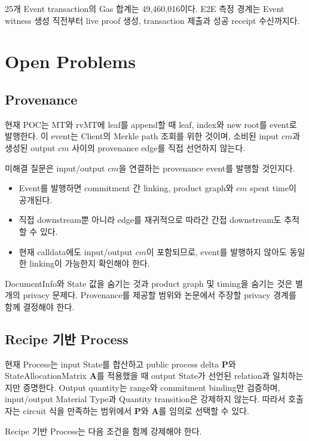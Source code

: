 \documentclass[11pt,a4paper]{extarticle}
\newcommand{\MT}{\mathrm{MT}}
\newcommand{\rvMT}{\mathrm{rvMT}}
\begin{document}
25개 Event transaction의 Gas 합계는 49,460,016이다. E2E 측정 경계는 Event witness
생성 직전부터 live proof 생성, transaction 제출과 성공 receipt 수신까지다.

\section{Open Problems}

\subsection{Provenance}

현재 POC는 $\MT$와 $\rvMT$에 leaf를 append할 때 leaf, index와 new root를 event로
발행한다. 이 event는 Client의 Merkle path 조회를 위한 것이며, 소비된 input $cm$과
생성된 output $cm$ 사이의 provenance edge를 직접 선언하지 않는다.

미해결 질문은 input/output $cm$을 연결하는 provenance event를 발행할 것인지다.

\begin{itemize}
  \item Event를 발행하면 commitment 간 linking, product graph와 $cm$ spent time이
        공개된다.
  \item 직접 downstream뿐 아니라 edge를 재귀적으로 따라간 간접 downstream도 추적할 수
        있다.
  \item 현재 calldata에도 input/output $cm$이 포함되므로, event를 발행하지 않아도 동일한
        linking이 가능한지 확인해야 한다.
\end{itemize}

DocumentInfo와 State 값을 숨기는 것과 product graph 및 timing을 숨기는 것은 별개의
privacy 문제다. Provenance를 제공할 범위와 논문에서 주장할 privacy 경계를 함께 결정해야
한다.

\subsection{Recipe 기반 Process}

현재 Process는 input State를 합산하고 public process delta $\mathbf{P}$와
StateAllocationMatrix $\mathbf{A}$를 적용했을 때 output State가 선언된 relation과
일치하는지만 증명한다. Output quantity는 range와 commitment binding만 검증하며,
input/output Material Type과 Quantity transition은 강제하지 않는다. 따라서 호출자는
circuit 식을 만족하는 범위에서 $\mathbf{P}$와 $\mathbf{A}$를 임의로 선택할 수 있다.

Recipe 기반 Process는 다음 조건을 함께 강제해야 한다.
\end{document}
